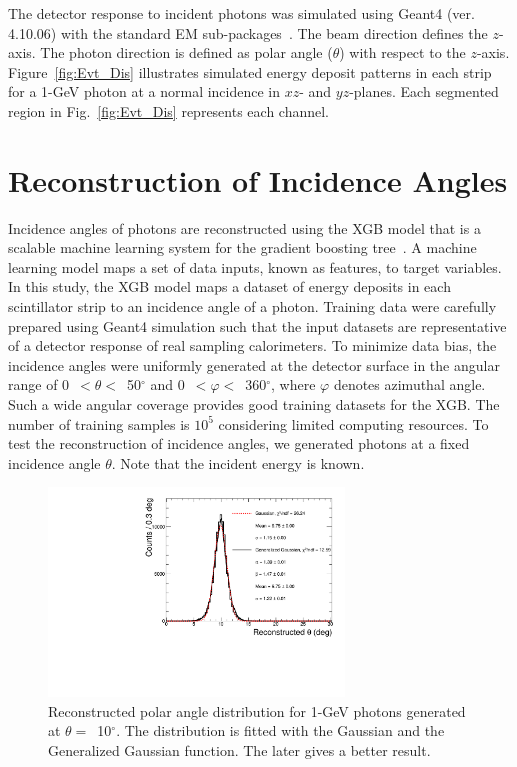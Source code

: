 \documentclass[preprint,12pt,times,a4paper]{elsarticle}
\begin{document}
The detector response to incident photons was simulated using Geant4 (ver. 4.10.06) with the standard EM sub-packages~\cite{GEANT4}. The beam direction defines the $z$-axis. The photon direction is defined as polar angle ($\theta$) with respect to the $z$-axis. Figure~\ref{fig:Evt_Dis} illustrates simulated energy deposit patterns in each strip for a 1-GeV photon at a normal incidence in $xz$- and $yz$-planes. Each segmented region in Fig.~\ref{fig:Evt_Dis} represents each channel.

\section{Reconstruction of Incidence Angles}
\label{sec:res}

Incidence angles of photons are reconstructed using the XGB model that is a scalable machine learning system for the gradient boosting tree~\cite{xgboost:2016}. A machine learning model maps a set of data inputs, known as features, to target variables. In this study, the XGB model maps a dataset of energy deposits in each scintillator strip to an incidence angle of a photon. Training data were carefully prepared using Geant4 simulation such that the input datasets are representative of a detector response of real sampling calorimeters. To minimize data bias, the incidence angles were uniformly generated at the detector surface in the angular range of 0~$<\theta<$~50$^{\circ}$ and 0~$<\varphi<$~360$^{\circ}$, where $\varphi$ denotes azimuthal angle. Such a wide angular coverage provides good training datasets for the XGB. The number of training samples is $10^{5}$ considering limited computing resources. To test the reconstruction of incidence angles, we generated photons at a fixed incidence angle $\theta$. Note that the incident energy is known.

\begin{figure}[!hbt]
\centering
\includegraphics[width=0.7\textwidth]{figures/Fig3_fit_GG.pdf}
\caption{ Reconstructed polar angle distribution for 1-GeV photons generated at $\theta=$~10$^{\circ}$. The distribution is fitted with the Gaussian and the Generalized Gaussian function. The later gives a better result.}
\label{fig:angle_10degree}
\end{figure}
\end{document}
